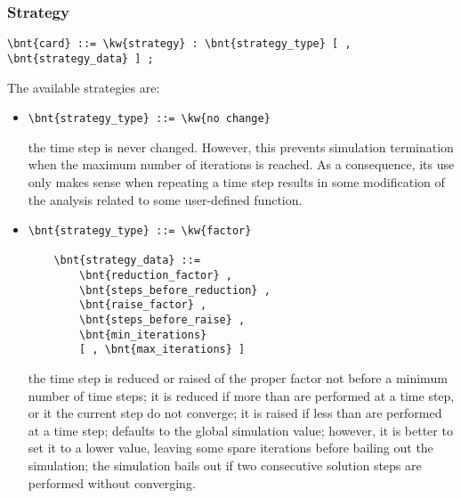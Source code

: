 \subsubsection{Strategy}
\begin{Verbatim}[commandchars=\\\{\}]
    \bnt{card} ::= \kw{strategy} : \bnt{strategy_type} [ , \bnt{strategy_data} ] ;
\end{Verbatim}
The available strategies are:
\begin{itemize}
\item {}
\begin{Verbatim}[commandchars=\\\{\}]
    \bnt{strategy_type} ::= \kw{no change}
\end{Verbatim}
the time step is never changed.
However, this prevents simulation termination when the maximum number
of iterations is reached.
As a consequence, its use only makes sense when repeating a time step
results in some modification of the analysis related to some user-defined
function.

\item {}
\begin{Verbatim}[commandchars=\\\{\}]
    \bnt{strategy_type} ::= \kw{factor}

    \bnt{strategy_data} ::= 
        \bnt{reduction_factor} ,
        \bnt{steps_before_reduction} ,
        \bnt{raise_factor} ,
        \bnt{steps_before_raise} ,
        \bnt{min_iterations}
        [ , \bnt{max_iterations} ]
\end{Verbatim}
the time step is reduced or raised of the proper factor not before a
minimum number of time steps; it is reduced if more than 
 are performed at a time step, or it the current
step do not converge; it is raised if less
than  are performed at a time step;
 defaults to the global 
simulation value; however, it is better to set it to a lower value,
leaving some spare iterations before bailing out the simulation; 
the simulation bails out if two consecutive solution steps
are performed without converging.


\end{itemize}
